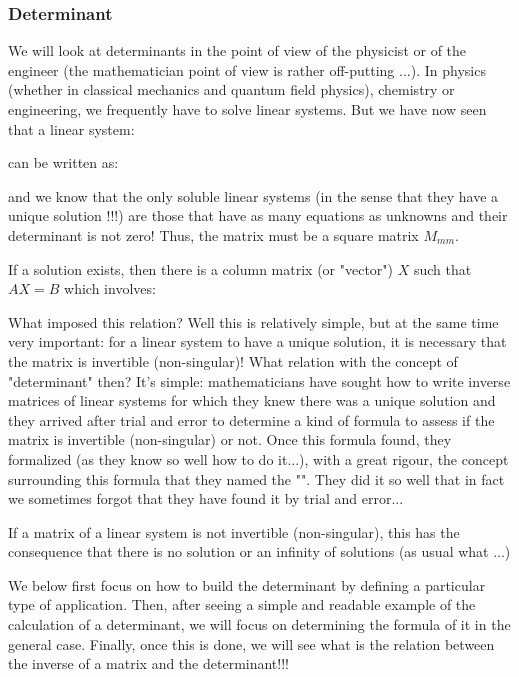 	\subsubsection{Determinant}\label{determinant}
	We will look at determinants in the point of view of the physicist or of the engineer (the mathematician point of view is rather off-putting ...). In physics (whether in classical mechanics and quantum field physics), chemistry or engineering, we frequently have to solve linear systems. But we have now seen that a linear system:
	
	can be written as:
	
	and we know that the only soluble linear systems (in the sense that they have a unique solution !!!) are those that have as many equations as unknowns and their determinant is not zero! Thus, the matrix must be a square matrix $M_{mm}$.
	
	If a solution exists, then there is a column matrix (or "vector") $X$ such that $AX=B$ which involves:
	
	What imposed this relation? Well this is relatively simple, but at the same time very important: for a linear system to have a unique solution, it is necessary that the matrix is invertible (non-singular)! What relation with the  concept of "determinant" then? It's simple: mathematicians have sought how to write inverse matrices of linear systems for which they knew there was a unique solution and they arrived after trial and error to determine a kind of formula to assess if the matrix is invertible (non-singular) or not. Once this formula found, they formalized (as they know so well how to do it...), with a great rigour, the concept surrounding this formula that they named the "". They did it so well that in fact we sometimes forgot that they have found it by trial and error...
	\begin{tcolorbox}[title=Remark,colframe=black,arc=10pt]
	If a matrix of a linear system is not invertible (non-singular), this has the consequence that there is no solution or an infinity of solutions (as usual what ...)
	\end{tcolorbox}
	We below first focus on how to build the determinant by defining a particular type of application. Then, after seeing a simple and readable example of the calculation of a determinant, we will focus on determining the formula of it in the general case. Finally, once this is done, we will see what is the relation between the inverse of a matrix and the determinant!!!
	
